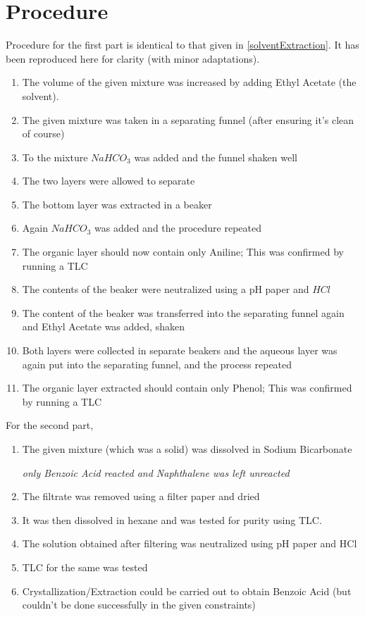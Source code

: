 \section{Procedure}
	Procedure for the first part is identical to that given in \autoref{solventExtraction}. It has been reproduced here for clarity (with minor adaptations).
	\begin{enumerate}
		\item The volume of the given mixture was increased by adding Ethyl Acetate (the solvent).
		\item The given mixture was taken in a separating funnel (after ensuring it's clean of course)
		\item To the mixture $NaHCO_3$ was added and the funnel shaken well
		\item The two layers were allowed to separate
		\item The bottom layer was extracted in a beaker
		\item Again $NaHCO_3$ was added and the procedure repeated
		\item The organic layer should now contain only Aniline; This was confirmed by running a TLC
		\item The contents of the beaker were neutralized using a pH paper and $HCl$
		\item The content of the beaker was transferred into the separating funnel again and Ethyl Acetate was added, shaken
		\item Both layers were collected in separate beakers and the aqueous layer was again put into the separating funnel, and the process repeated
		\item The organic layer extracted should contain only Phenol; This was confirmed by running a TLC
	\end{enumerate}
	\par
	For the second part, 
	\begin{enumerate}
		\item The given mixture (which was a solid) was dissolved in Sodium Bicarbonate
		\par
			\emph{only Benzoic Acid reacted and Naphthalene was left unreacted}
		\item The filtrate was removed using a filter paper and dried
		\item It was then dissolved in hexane and was tested for purity using TLC.
		\item The solution obtained after filtering was neutralized using pH paper and HCl
		\item TLC for the same was tested
		\item Crystallization/Extraction could be carried out to obtain Benzoic Acid (but couldn't be done successfully in the given constraints)
	\end{enumerate}

